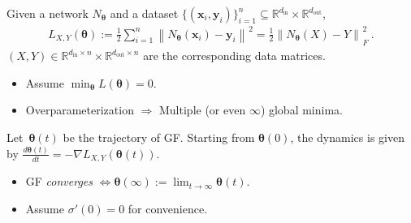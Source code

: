 \documentclass[handout,usenames,dvipsnames]{beamer} %
\newcommand{\din}{{d_{\text{in}}}}
\newcommand{\dout}{{d_{\text{out}}}}
\newcommand{\norm}[2][]{{\left\|{#2}\right\|_{#1}}}
\newcommand{\bx}{\mathbf{x}}
\newcommand{\by}{\mathbf{y}}
\newcommand{\btheta}{{\boldsymbol{\theta}}}
\newcommand{\reals}{{\mathbb R}}
\begin{document}
\begin{frame}
    \pause
    \begin{definition}
        Given a network $N_\btheta$ and a dataset $\{(\bx_i,\by_i)\}_{i=1}^n \subseteq \reals^\din \times \reals^\dout$,
        \begin{align} \label{eq:objective}
        	 L_{X,Y}(\btheta) 
        	 := \frac{1}{2} \sum_{i=1}^n \norm{N_\btheta(\bx_i) - \by_i}^2
        	 = \frac{1}{2} \norm{N_\btheta(X) - Y}_F^2~.
        \end{align}
        $(X,Y) \in \reals^{\din \times n} \times \reals^{\dout \times n}$ are the corresponding data matrices.
    \end{definition}
    \pause
    \begin{itemize}
            \item Assume $\min_\btheta L(\btheta)=0$.
            \pause
            \item Overparameterization $\Rightarrow$ Multiple (or even $\infty$) global minima.
        \end{itemize}
    \pause
    \begin{definition}
        Let~$\btheta(t)$ be the trajectory of GF. Starting from $\btheta(0)$, the dynamics is given by $\frac{d \btheta(t)}{dt} = -\nabla L_{X,Y}(\btheta(t))$.
    \end{definition}
    \begin{itemize}
        \pause
        \item GF \emph{converges} $\Leftrightarrow \btheta(\infty) := \lim_{t \to \infty}\btheta(t)$.
        \pause
        \item Assume $\sigma'(0) = 0$ for convenience.
    \end{itemize}
    

\end{frame}
\end{document}
